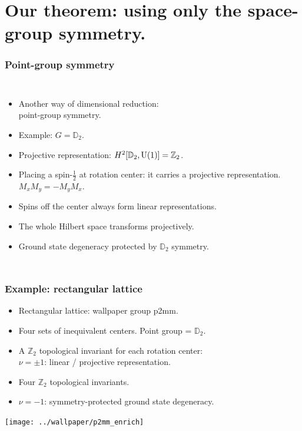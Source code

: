 \documentclass[xcolor=table, 10pt, aspectratio=43]{beamer}
\begin{document}
\section{Our theorem: using only the space-group symmetry.}

\begin{frame}
\frametitle{Point-group symmetry}
\begin{columns}
\begin{itemize}
\item Another way of dimensional reduction:\\ point-group symmetry.
\item Example: $G=\mathbb D_2$.
\item Projective representation: $H^2[\mathbb D_2, \text U(1)]=\mathbb Z_2$.
\item Placing a spin-$\frac12$ at rotation center: it carries a projective representation. $M_xM_y=-M_yM_x$.
\item Spins off the center always form linear representations.
\item The whole Hilbert space transforms projectively.
\item Ground state degeneracy protected by $\mathbb D_2$ symmetry.
\end{itemize}
\end{columns}
\end{frame}

\begin{frame}
\frametitle{Example: rectangular lattice}
\begin{itemize}
\item Rectangular lattice: wallpaper group p2mm.
\item Four sets of inequivalent centers. Point group = $\mathbb D_2$.
\item A $\mathbb Z_2$ topological invariant for each rotation center:\\
  $\nu=\pm1$: linear / projective representation.
\item Four $\mathbb Z_2$ topological invariants.
\item $\nu=-1$: symmetry-protected ground state degeneracy.
\end{itemize}
\begin{center}
\texttt{[image: ../wallpaper/p2mm\_enrich]}
\end{center}
\end{frame}
\end{document}
